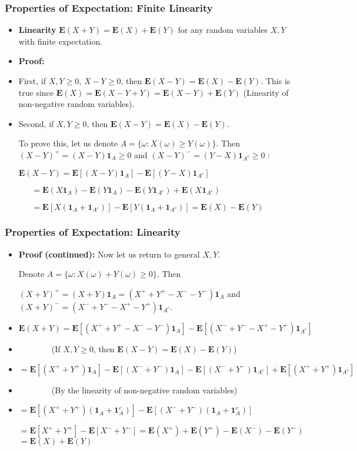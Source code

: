 \documentclass[handout]{beamer}
\newcommand{\BE}{\mathbf{E}}
\newcommand{\BI}{\mathbf{1}}
\begin{document}
\frame
{
  \frametitle{Properties of Expectation: Finite Linearity}

   \begin{itemize}

 \item<1-> \textbf{Linearity} $\BE(X+Y)=\BE(X)+\BE(Y)$ for any random variables $X, Y$ with finite expectation.
  
   \item<2-> \textbf{Proof:}  
   
 \item<3->[-]First, if $X, Y\geq 0$, $X-Y\geq 0$, then $\BE(X-Y)=\BE(X)-\BE(Y)$.  This is true since $\BE(X)=\BE(X-Y+Y)=\BE(X-Y)+\BE(Y)$ (Linearity of non-negative random variables).                                           
  \item<4->[-] Second, if $X, Y\geq 0$, then $\BE(X-Y)=\BE(X)-\BE(Y)$. 
  
  To prove this, let us denote $A=\{\omega: X(\omega)\geq Y(\omega)\}$. Then $(X-Y)^+=(X-Y)\BI_A \geq 0$ and $(X-Y)^-=(Y-X)\BI_{A^c} \geq 0$ :
  
 $\BE(X-Y)=\BE[(X-Y)\BI_A]-\BE[(Y-X)\BI_{A^c}]$ 
 
 $\ \ \ \ \ \ \  =\BE(X\BI_A)-\BE(Y\BI_A)-\BE(Y\BI_{A^c})+\BE(X\BI_{A^c})$
 
 $\ \ \ \ \ \ \ =\BE[X(\BI_A+\BI_{A^c})]-\BE[Y(\BI_{A}+\BI_{A^c})]=\BE(X)-\BE(Y)$
\end{itemize}
}


\frame
{
  \frametitle{Properties of Expectation: Linearity}

   \begin{itemize}

  
   \item<1-> \textbf{Proof (continued):} Now let us return to general $X, Y$. 
   
   Denote $A=\{\omega: X(\omega)+Y(\omega)\geq 0\}$. Then 
   
    $(X+Y)^+=(X+Y)\BI_A=(X^++Y^+-X^--Y^-)\BI_A $ and $(X+Y)^-=(X^-+Y^--X^+-Y^+)\BI_{A^c}$. \newline
    
      
\item<2->[-]$\BE(X+Y)=\BE[(X^++Y^+-X^--Y^-)\BI_A]-\BE[(X^-+Y^--X^+-Y^+)\BI_{A^c}]$

\item<3->[]          \ \ \ \     \ \ \ \     (If $X, Y\geq 0$, then $\BE(X-Y)=\BE(X)-\BE(Y)$)

\item<3-> []$ =\BE[(X^++Y^+)\BI_A]-\BE[(X^-+Y^-)\BI_A]-\BE[(X^-+Y^-)\BI_{A^c}]+\BE[(X^++Y^+)\BI_{A^c}]$


\item<4->[]    \ \ \ \    \ \ \ \   (By the linearity of non-negative random variables)

\item<4-> []$ =\BE[(X^++Y^+) (\BI_A+ \BI_A^c) ]-\BE[(X^-+Y^-)(\BI_A+ \BI_A^c) ]$

$=\BE[X^++Y^+]-\BE[X^-+Y^-]=\BE(X^+)+\BE(Y^+)-\BE(X^-)-\BE(Y^-)$
$=\BE(X)+\BE(Y)$


\end{itemize}
}
\end{document}
